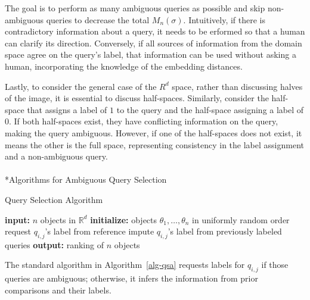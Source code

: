 \documentclass[
  letterpaper,
  numbers=noenddot,
  DIV=11]{scrreprt}
\makeatletter
\let\oldparagraph\paragraph
\renewcommand{\paragraph}{
    \@ifstar
      \xxxParagraphStar
      \xxxParagraphNoStar
  }
\newcommand{\xxxParagraphStar}[1]{\oldparagraph*{#1}\mbox{}}
\newcommand{\xxxParagraphNoStar}[1]{\oldparagraph{#1}\mbox{}}
\theoremstyle{definition}
\theoremstyle{plain}
\theoremstyle{plain}
\theoremstyle{remark}
\makeatother
\begin{document}
The goal is to perform as many ambiguous queries as possible and skip
non-ambiguous queries to decrease the total \(M_n(\sigma)\).
Intuitively, if there is contradictory information about a query, it
needs to be erformed so that a human can clarify its direction.
Conversely, if all sources of information from the domain space agree on
the query's label, that information can be used without asking a human,
incorporating the knowledge of the embedding distances.

Lastly, to consider the general case of the \(R^d\) space, rather than
discussing halves of the image, it is essential to discuss half-spaces.
Similarly, consider the half-space that assigns a label of \(1\) to the
query and the half-space assigning a label of \(0\). If both half-spaces
exist, they have conflicting information on the query, making the query
ambiguous. However, if one of the half-spaces does not exist, it means
the other is the full space, representing consistency in the label
assignment and a non-ambiguous query.

\paragraph*{Algorithms for Ambiguous Query
Selection}\label{algorithms-for-ambiguous-query-selection}

\begin{algorithm}[H]
    \caption{Query Selection Algorithm}
    \label{alg-qsa}
\begin{algorithmic}[1]
        \State \textbf{input:} $n$ objects in $\mathbb{R}^d$
        \State \textbf{initialize:} objects $\theta_1, \dots, \theta_n$ in uniformly random order
                    \State request $q_{i,j}$'s label from reference
                \Else
                    \State impute $q_{i,j}$'s label from previously labeled queries
                \EndIf
            \EndFor
        \EndFor
        \State \textbf{output:} ranking of $n$ objects
    \end{algorithmic}
\end{algorithm}

The standard algorithm in  Algorithm~\ref{alg-qsa}  requests labels for
\(q_{i,j}\) if those queries are ambiguous; otherwise, it infers the
information from prior comparisons and their labels.
\end{document}
